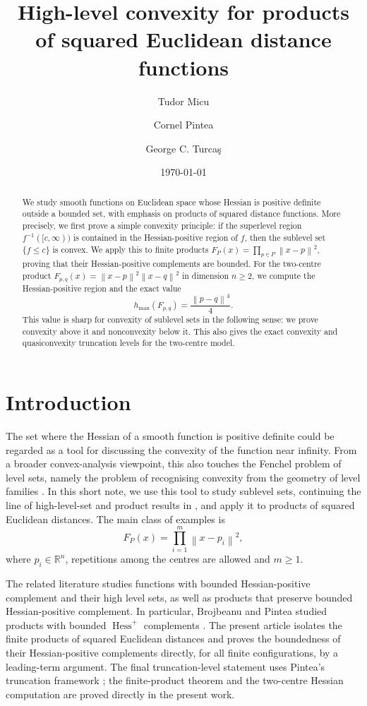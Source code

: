 \documentclass[11pt]{amsart}
\title{High-level convexity for products of squared Euclidean distance functions}
\author{Tudor Micu}
\author{Cornel Pintea}
\author{George C. Turca\c{s}}
\date{\today}
\theoremstyle{remark}
\newcommand{\Hessp}{\operatorname{Hess}^{+}}
\newcommand{\R}{\mathbb{R}}
\newcommand{\norm}[1]{\left\lVert #1\right\rVert}
\begin{document}
\begin{abstract}
We study smooth functions on Euclidean space whose Hessian is positive definite outside a bounded set, with emphasis on products of squared distance functions. More precisely, we first prove a simple convexity principle: if the superlevel region $f^{-1}([c,\infty))$ is contained in the Hessian-positive region of $f$, then the sublevel set $\{f\le c\}$ is convex. We apply this to finite products $F_P(x)=\prod_{p\in P}\norm{x-p}^2$, proving that their Hessian-positive complements are bounded. For the two-centre product $F_{p,q}(x)=\norm{x-p}^2\norm{x-q}^2$ in dimension $n\ge2$, we compute the Hessian-positive region and the exact value
\[
 h_{\max}(F_{p,q})=\frac{\norm{p-q}^4}{4}.
\]
This value is sharp for convexity of sublevel sets in the following sense: we prove convexity above it and nonconvexity below it. This also gives the exact convexity and quasiconvexity truncation levels for the two-centre model.
\end{abstract}

\maketitle

\section{Introduction}

The set where the Hessian of a smooth function is positive definite could be regarded as a tool for discussing the convexity of the function near infinity. From a broader convex-analysis viewpoint, this also touches the Fenchel problem of level sets, namely the problem of recognising convexity from the geometry of level families \cite{Rapcsak2005FenchelLevelSets}. In this short note, we
use this tool to study sublevel sets, continuing the line of high-level-set and
product results in
\cite{Pintea2022LevelSets,BrojbeanuPintea-JCA,BrojbeanuPintea2022HessPlus}, and
apply it to products of squared Euclidean distances. The main class of examples is
\[
 F_P(x)=\prod_{i=1}^m \norm{x-p_i}^2,
\]
where $p_i\in\R^n$, repetitions among the centres are allowed and $m\ge1$.

The related literature studies functions with bounded Hessian-positive
complement and their high level sets, as well as products that preserve bounded
Hessian-positive complement. In particular, Brojbeanu and Pintea studied
products with bounded $\Hessp$ complements
\cite{BrojbeanuPintea-JCA,BrojbeanuPintea2022HessPlus}. The present article
isolates the finite products of squared Euclidean distances and proves the
boundedness of their Hessian-positive complements directly, for all finite
configurations, by a leading-term argument. The final truncation-level
statement uses Pintea's truncation framework \cite{Pintea2026Cqt}; the
finite-product theorem and the two-centre Hessian computation are proved
directly in the present work.
\end{document}
